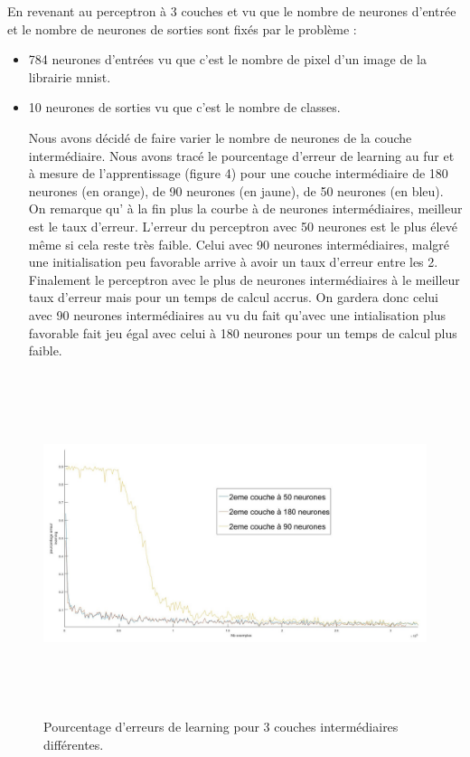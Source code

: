 \documentclass[a4paper,twoside]{report}
\begin{document}
\newpage
En revenant au perceptron à 3 couches et vu que le nombre de neurones d'entrée et le nombre de neurones de sorties sont fixés par le problème  :
\begin{itemize}
\item 784 neurones d'entrées vu que c'est le nombre de pixel d'un image de la librairie mnist.
\item 10 neurones de sorties vu que c'est le nombre de classes.


Nous avons décidé de faire varier le nombre de neurones de la couche intermédiaire. Nous avons tracé le pourcentage d'erreur de learning au fur et à mesure de l'apprentissage (figure 4) pour une couche intermédiaire de 180 neurones (en orange), de 90 neurones (en jaune), de 50 neurones (en bleu). On remarque qu' à la fin plus la courbe à de neurones intermédiaires, meilleur est le taux d'erreur. L'erreur du perceptron avec 50 neurones est le plus élevé même si cela reste très faible. Celui avec 90 neurones intermédiaires, malgré une initialisation peu favorable arrive à avoir un taux d'erreur entre les 2. Finalement le perceptron avec le plus de neurones intermédiaires à le meilleur taux d'erreur mais pour un temps de calcul accrus. On gardera donc celui avec 90 neurones intermédiaires au vu du fait qu'avec une intialisation plus favorable fait jeu égal avec celui à 180 neurones pour un temps de calcul plus faible. 
\end{itemize}
\begin{figure}[!h]
	\begin{center}
		\includegraphics[width=17cm,height=10cm]{Images/courbes3couche.jpg} 
		\caption{Pourcentage d'erreurs de learning pour 3 couches intermédiaires différentes.}
	\end{center}
\end{figure}
\end{document}
